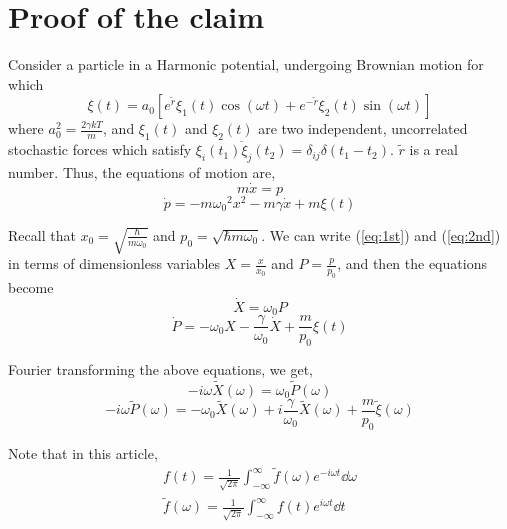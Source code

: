 \documentclass[12pt, twoside]{article}
\begin{document}
\section{Proof of the claim}
Consider a particle in a Harmonic potential, undergoing Brownian motion for which \begin{equation}\label{eq: stochastic}
	\xi(t) =  a_0 [e^{\tilde{r}} \xi_1(t) \cos(\omega t) + e^{-{\tilde{r}}} \xi_2(t)\sin(\omega t)]
\end{equation} where $a_0 ^ 2 = \frac{2 \gamma k T}{m}$, and $\xi_1(t)$ and $\xi_2(t)$ are two independent, uncorrelated stochastic forces which satisfy $\overline{\xi_i(t_1)\xi_j(t_2)} = \delta_{ij}\delta(t_1 - t_2)$. $\tilde{r}$ is a real number. Thus, the equations of motion are, \begin{equation}\label{eq:1st}
m \dot{x} = p
\end{equation}
\begin{equation}\label{eq:2nd}
	\dot{p} = -m{\omega_0}^2 x^2 - m\gamma\dot{x} + m\xi(t)
\end{equation}

Recall that $x_0 =\sqrt{\frac{\hbar}{ m\omega_0}}$ and $p_0 = \sqrt{\hbar m \omega_0}$. We can write (\ref{eq:1st}) and (\ref{eq:2nd}) in terms of dimensionless variables $X = \frac{x}{x_0}$ and $P = \frac{p}{p_0}$, and then the equations become
\begin{equation}\label{eq:1}
	\dot{X} =\omega_0 P
\end{equation}
\begin{equation}\label{eq:2}
	\dot{P} = -\omega_0 X -\frac{\gamma}{\omega_0}\dot{X} + \frac{m}{p_0}\xi(t)
\end{equation}

Fourier transforming the above equations, we get, \begin{equation}\label{eq:3}
-i\omega\widetilde{X}(\omega) =\omega_0 \widetilde{P}(\omega)
\end{equation}
\begin{equation}\label{eq:4}
-i\omega\widetilde{P}(\omega) = -\omega_0 \widetilde{X}(\omega) +i\frac{\gamma}{\omega_0}\widetilde{X}(\omega) + \frac{m}{p_0}\widetilde{\xi}(\omega)
\end{equation}

Note that in this article, $$
\begin{array} { l } { f ( t ) = \frac { 1 } { \sqrt { 2 \pi } } \int _ { - \infty } ^ { \infty } \tilde { f } ( \omega ) e ^ { - i \omega t } \dd{\omega} } \\ { \tilde { f } ( \omega ) = \frac { 1 } { \sqrt { 2 \pi } } \int _ { - \infty } ^ { \infty } f ( t ) e ^ { i \omega t } \dd{t} } \end{array}
$$
\end{document}
